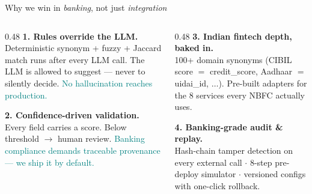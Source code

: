 \documentclass[aspectratio=169,11pt]{beamer}
\begin{document}
\begin{frame}{Why we win in \emph{banking}, not just \emph{integration}}
\vspace{0.2em}
\begin{columns}[T]
\begin{column}{0.48\textwidth}
\textbf{1. Rules override the LLM.}\\
{\small Deterministic synonym + fuzzy + Jaccard match runs after every LLM call. The LLM is allowed to suggest --- never to silently decide. \textcolor{teal}{No hallucination reaches production.}}

\vspace{0.6em}
\textbf{2. Confidence-driven validation.}\\
{\small Every field carries a score. Below threshold $\to$ human review. \textcolor{teal}{Banking compliance demands traceable provenance --- we ship it by default.}}
\end{column}
\begin{column}{0.48\textwidth}
\textbf{3. Indian fintech depth, baked in.}\\
{\small 100+ domain synonyms (CIBIL score $=$ credit\_score, Aadhaar $=$ uidai\_id, $\ldots$). Pre-built adapters for the 8 services every NBFC actually uses.}

\vspace{0.6em}
\textbf{4. Banking-grade audit \& replay.}\\
{\small Hash-chain tamper detection on every external call $\cdot$ 8-step pre-deploy simulator $\cdot$ versioned configs with one-click rollback.}
\end{column}
\end{columns}
\end{frame}
\end{document}
